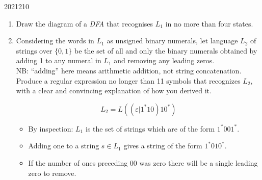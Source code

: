 \documentclass[10pt,\jkfside,a4paper]{article}
\newcommand{\dfa}{\textit{DFA} }
\begin{document}
\begin{examquestion}{2021}{2}{10}
\begin{enumerate}
\begin{enumerate}

\item Draw the diagram of a \dfa that recognises $L_1$ in no more than four states.

\begin{center}
\end{center}

\item Considering the words in $L_1$ as unsigned binary numerals, let language $L_2$ of strings over 
$\{0, 1\}$ be the set of all and only the binary numerals obtained by adding 1 to any numeral in 
$L_1$ and removing any leading zeros.\\
NB: ``adding'' here means arithmetic addition, not string concatenation.\\
Produce a regular expression no longer than 11 symbols that recognizes $L_2$, with a 
clear and convincing explanation of how you derived it.

\[
L_2 = L((\varepsilon|1^*10)10^*)
\]

\begin{itemize}

\item By inspection: $L_1$ is the set of strings which are of the form $1^*001^*$. 

\item Adding one to a string $s \in L_1$ gives a string of the form $1^*010^*$.

\item 

If the number of ones preceding 00 was zero there will be a single leading zero to remove. 


\end{itemize}
\end{enumerate}
\end{enumerate}
\end{examquestion}
\end{document}
